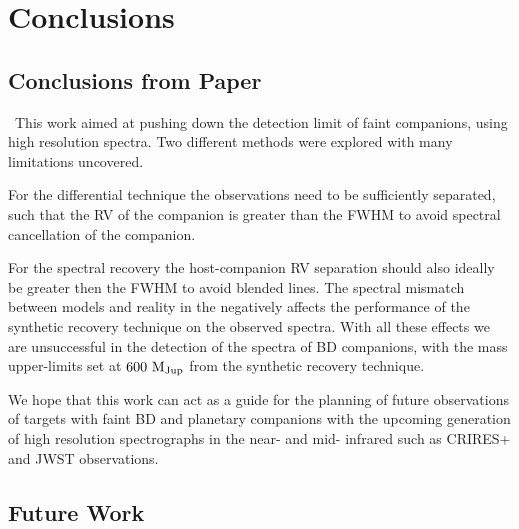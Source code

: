 
\chapter{Conclusions}  %

\label{cha:conclusions}


\section{Conclusions from Paper}
\label{sec:conclusions}
\
This work aimed at pushing down the detection limit of faint companions, using high resolution \nir{} spectra. Two different methods were explored with many limitations uncovered.
\unfinished{Update from paper}

For the differential technique the observations need to be sufficiently separated, such that the RV of the companion is greater than the FWHM to avoid spectral cancellation of the companion.

	For the spectral recovery the host-companion RV separation should also ideally be greater then the FWHM to avoid blended lines. The spectral mismatch between models and reality in the \nir{} negatively affects the performance of the synthetic recovery technique on the observed spectra. With all these effects we are unsuccessful in the detection of the \nir{} spectra of BD companions,  with the mass upper-limits set at \(\rm 600~M_{Jup}\) from the synthetic recovery technique.

We hope that this work can act as a guide for the planning of future observations of targets with faint BD and planetary companions with the upcoming generation of high resolution spectrographs in the near- and mid- infrared such as CRIRES+ and JWST observations.



\section{Future Work}
